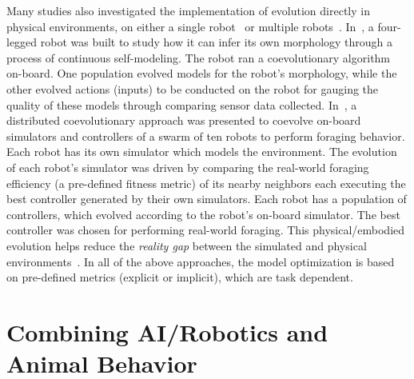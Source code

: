 Many studies also investigated the implementation of evolution directly in physical environments, on either a single robot~\cite{ Bongard-etal2006:science, Koos2013, Cully2015} or multiple robots~\cite{Alan2014}. In~\cite{Bongard-etal2006:science}, a four-legged robot was built to study how it can infer its own morphology through a process of continuous self-modeling. The robot ran a coevolutionary algorithm on-board. One population evolved models for the robot's morphology, while the other evolved actions (inputs) to be conducted on the robot for gauging the quality of these models through comparing sensor data collected. In~\cite{Alan2014}, a distributed coevolutionary approach was presented to coevolve on-board simulators and controllers of a swarm of ten robots to perform foraging behavior. Each robot has its own simulator which models the environment. The evolution of each robot's simulator was driven by comparing the real-world foraging efficiency (a pre-defined fitness metric) of its nearby neighbors each executing the best controller generated by their own simulators. Each robot has a population of controllers, which evolved according to the robot's on-board simulator. The best controller was chosen for performing real-world foraging. This physical/embodied evolution helps reduce the \textit{reality gap} between the simulated and physical environments~\cite{Jakobi95}. In all of the above approaches, the model optimization is based on pre-defined metrics (explicit or implicit), which are task dependent.


\section{Combining AI/Robotics and Animal Behavior}\label{sec:combine_AI_robotics_animal_behavior}

